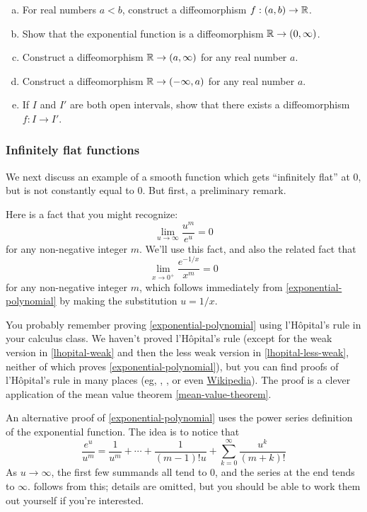 \begin{exercise} \label{open-intervals-diffeomorphic}
	\begin{enumerate}[(a)]
		\item For real numbers $a < b$, construct a diffeomorphism $f : (a, b) \to \mathbb{R}$.
		\item Show that the exponential function is a diffeomorphism $\mathbb{R} \to (0, \infty)$. 
		\item Construct a diffeomorphism $\mathbb{R} \to (a, \infty)$ for any real number $a$. 
		\item Construct a diffeomorphism $\mathbb{R} \to (-\infty, a)$ for any real number $a$. 
		\item If $I$ and $I'$ are both open intervals, show that there exists a diffeomorphism $f : I \to I'$. 
	\end{enumerate}
\end{exercise}

\subsubsection*{Infinitely flat functions}

We next discuss an example of a smooth function which gets ``infinitely flat'' at 0, but is not constantly equal to 0. But first, a preliminary remark. 

\begin{remark} \label{exponential-limit}
	Here is a fact that you might recognize:
	\begin{equation} \label{exponential-polynomial} \lim_{u \to \infty} \frac{u^m}{e^u} = 0 \end{equation}
	for any non-negative integer $m$. We'll use this fact, and also the related fact that
	\[ \lim_{x \to 0^+} \frac{e^{-1/x}}{x^m} = 0 \]
	for any non-negative integer $m$, which follows immediately from \cref{exponential-polynomial} by making the substitution $u = 1/x$.
	
	You probably remember proving \cref{exponential-polynomial} using l'H\^{o}pital's rule in your calculus class. We haven't proved l'H\^{o}pital's rule (except for the weak version in \cref{lhopital-weak} and then the less weak version in \cref{lhopital-less-weak}, neither of which proves \cref{exponential-polynomial}), but you can find proofs of l'H\^opital's rule in many places (eg, \cite[theorem 4.15]{protter-morrey}, \cite[theorem 5.13]{rudin}, or even \href{https://en.wikipedia.org/wiki/L\%27hopital\%27s_rule}{Wikipedia}). The proof is a clever application of the mean value theorem \ref{mean-value-theorem}. 
	
	An alternative proof of \cref{exponential-polynomial} uses the power series definition of the exponential function. The idea is to notice that
	\[ \frac{e^u}{u^m} = \frac{1}{u^m} + \dotsb + \frac{1}{(m-1)!u} + \sum_{k = 0}^\infty \frac{u^k}{(m+k)!} \]
	As $u \to \infty$, the first few summands all tend to 0, and the series at the end tends to $\infty$.  follows from this; details are omitted, but you should be able to work them out yourself if you're interested.
\end{remark} 

